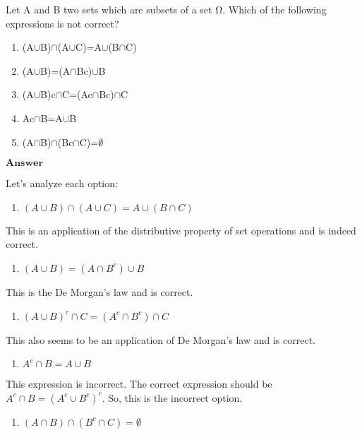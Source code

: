 \documentclass[11pt]{article}
\providecommand{\tightlist}{%
      \setlength{\itemsep}{0pt}\setlength{\parskip}{0pt}}
\begin{document}
Let A and B two sets which are subsets of a set Ω. Which of the
following expressions is not correct?

\begin{enumerate}
\def\labelenumi{\alph{enumi}.}
\item
  (A$\cup$B)$\cap$(A$\cup$C)=A$\cup$(B$\cap$C)
\item
  (A$\cup$B)=(A$\cap$Bc)$\cup$B
\item
  (A$\cup$B)c$\cap$C=(Ac$\cap$Bc)$\cap$C
\item
  Ac$\cap$B=A$\cup$B
\item
  (A$\cap$B)$\cap$(Bc$\cap$C)=$\emptyset$
\end{enumerate}

$\textbf{Answer}$

    Let's analyze each option:

\begin{enumerate}
\def\labelenumi{\alph{enumi}.}
\tightlist
\item
  $(A \cup B) \cap (A \cup C)=A \cup (B \cap C)$
\end{enumerate}

This is an application of the distributive property of set operations
and is indeed correct.

\begin{enumerate}
\def\labelenumi{\alph{enumi}.}
\setcounter{enumi}{1}
\tightlist
\item
  $(A \cup B)=(A \cap B^c) \cup B$
\end{enumerate}

This is the De Morgan's law and is correct.

\begin{enumerate}
\def\labelenumi{\alph{enumi}.}
\setcounter{enumi}{2}
\tightlist
\item
  $(A \cup B)^c \cap C=(A^c \cap B^c) \cap C$
\end{enumerate}

This also seems to be an application of De Morgan's law and is correct.

\begin{enumerate}
\def\labelenumi{\alph{enumi}.}
\setcounter{enumi}{3}
\tightlist
\item
  $A^c \cap B=A \cup B$
\end{enumerate}

This expression is incorrect. The correct expression should be
$A^c \cap B=(A^c \cup B^c)^c$. So, this is the incorrect option.

\begin{enumerate}
\def\labelenumi{\alph{enumi}.}
\setcounter{enumi}{4}
\tightlist
\item
  $(A \cap B) \cap (B^c \cap C)= \emptyset $
\end{enumerate}
\end{document}
